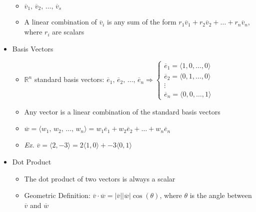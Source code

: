 \begin{itemize}
\begin{itemize}
      \item $\overline{v}_1,\,\overline{v}_2,\,\dots,\,\overline{v}_s$

      \item A linear combination of $\overline{v}_i$ is any sum of the form $r_1\overline{v}_1+r_2\overline{v}_2+\dots+r_n\overline{v}_n$, where $r_i$ are scalars

    \end{itemize}

  \item Basis Vectors

    \begin{itemize}

      \item $\mathbb{R}^n$ standard basis vectors: $\overline{e}_1,\,\overline{e}_2,\,\dots,\,\overline{e}_n\Rightarrow\left\{\begin{array}{c} \overline{e}_1=\langle 1, 0, \dots, 0\rangle\\\overline{e}_2=\langle 0, 1, \dots, 0\rangle\\ \vdots\\ \overline{e}_n = \langle 0, 0, \dots, 1\rangle\end{array}$

      \item Any vector is a linear combination of the standard basis vectors

      \item $\overline{w}=\langle w_1,\,w_2,\,\dots,\,w_n\rangle= w_1\overline{e}_1 + w_2\overline{e}_2 + \dots + w_n\overline{e}_n$

      \item \textit{Ex.} $\overline{v}=\langle 2, -3 \rangle = 2\langle 1, 0 \rangle + -3 \langle 0, 1 \rangle$

    \end{itemize}

  \item Dot Product

    \begin{itemize}

      \item The dot product of two vectors is always a scalar

      \item Geometric Definition: $\overline{v} \cdot \overline{w} = |\overline{v}||\overline{w}|\cos(\theta)$, where $\theta$ is the angle between $\overline{v}$ and $\overline{w}$

        \begin{itemize}


\end{itemize}
\end{itemize}
\end{itemize}

